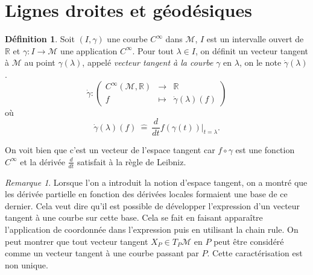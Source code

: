 \documentclass[a4paper,11pt]{report}
\theoremstyle{definition}
\theoremstyle{plain}
\theoremstyle{definition}
\newtheorem{defn}{Définition}[chapter]
\theoremstyle{remark}
\newtheorem{rmk}{Remarque}[chapter]
\newcommand{\M}{\mathscr{M}}
\begin{document}
        \section{Lignes droites et géodésiques}
        
            \begin{defn}
                Soit $(I,\gamma)$ une courbe $C^\infty$ dans $\M$, $I$ est  un intervalle ouvert de $\mathbb{R}$ et $\gamma:I\to\M$ une application $C^\infty$. Pour tout $\lambda\in I$, on définit un vecteur tangent à $\M$ au point $\gamma(\lambda)$, appelé \textit{vecteur tangent à la courbe} $\gamma$ en $\lambda$, on le note $\dot{\gamma}(\lambda)$.
                \begin{equation}
                    \dot{\gamma}:\left(
                    \begin{array}{ccc}
                        C^\infty(\M,\mathbb{R}) & \longrightarrow & \mathbb{R} \\
                        f & \longmapsto & \dot{\gamma}(\lambda)(f)
                    \end{array}
                    \right)
                    \end{equation}
                    où
                    \begin{equation}
                         \dot{\gamma}(\lambda)(f) ~\hat{=}~ \frac{d}{dt}f(\gamma(t))|_{t=\lambda}.
                    \end{equation}
            \end{defn}
            
            On voit bien que c'est un vecteur de l'espace tangent car $f\circ\gamma$ est une fonction $C^\infty$ et la dérivée $\frac{d}{dt}$ satisfait à la règle de Leibniz.
            
            \begin{rmk}
                Lorsque l'on a introduit la notion d'espace tangent, on a montré que les dérivée partielle en fonction des dérivées locales formaient une base de ce dernier. Cela veut dire qu'il est possible de développer l'expression d'un vecteur tangent à une courbe sur cette base. Cela se fait en faisant apparaître l'application de coordonnée dans l'expression puis en utilisant la chain rule. On peut montrer que tout vecteur tangent $X_P\in T_P\M$ en $P$ peut être considéré comme un vecteur tangent à une courbe passant par $P$. Cette caractérisation est non unique.
            \end{rmk}
            
\end{document}
